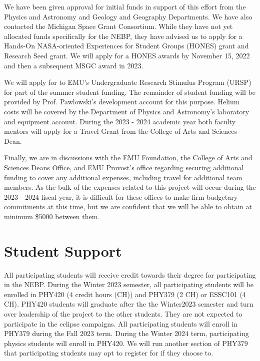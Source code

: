 \documentclass[12pt]{article}
\begin{document}
We have been given approval for initial funds in support of this effort
from the Physics and Astronomy and
Geology and Geography Departments.
We have also contacted the Michigan Space Grant Consortium.
While they have not yet allocated funds specifically for the NEBP, they
have advised us to apply for a Hands-On NASA-oriented Experiences for Student Groups (HONES)
grant and Research Seed grant. We will apply for
a HONES awards by November 15, 2022 and then a subsequent MSGC award in 2023.

We will apply for to EMU's Undergraduate
Research Stimulus Program (URSP) for part of the summer student funding. The remainder
of  student funding will be provided by
Prof. Pawlowski's development account for this purpose.
Helium costs will be covered by the Department of Physics and Astronomy's laboratory
and equipment account. During the 2023 - 2024 academic year both faculty mentors will
apply for a Travel Grant from the College of Arts and Sciences Dean.

Finally, we are in discussions with the EMU Foundation, the College of Arts and Sciences
Deans Office, and EMU Provost's office regarding securing additional funding to cover
any additional expenses, including travel for additional team members. As the bulk of the expenses related to this project will occur
during the 2023 - 2024 fiscal year, it is difficult for these offices to make firm budgetary
commitments at this time, but we are confident that we will be able to obtain at minimum
\$5000 between them.






\newpage
\section{Student Support}
All participating students will receive credit towards their degree for
participating in the NEBP. During the Winter 2023 semester, all participating students
will be enrolled in PHY420 (4 credit hours (CH)) and PHY379 (2 CH)
or ESSC101 (4 CH). PHY420 students will graduate after the the Winter2023 semester and
turn over leadership of the project to the other students. They are not expected to
 participate in the eclipse campaigns.
All participating students will enroll in PHY379 during the Fall 2023 term. During the
Winter 2024 term, participating physics students will enroll in PHY420. We will run
another section of PHY379 that participating students may opt to register for if they
choose to.
\end{document}
